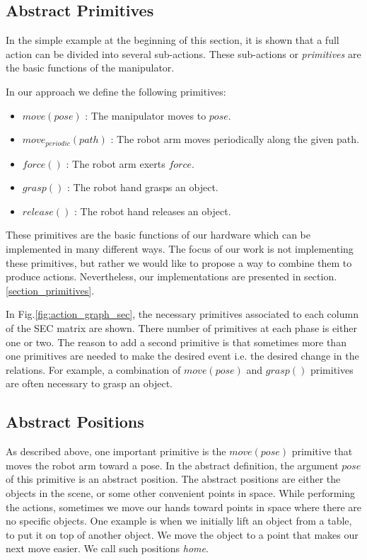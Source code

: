 \subsection{Abstract Primitives}
\label{sec:abstract_primitives}
In the simple example at the beginning of this section, it is shown that a full action can be divided into several sub-actions.
These sub-actions or \textit{primitives} are the basic functions of the manipulator.

In our approach we define the following primitives:
\begin{itemize}
 \item $move(pose)$ :  The manipulator moves to $pose$.
 \item $move_{periodic}(path)$ : The robot arm moves periodically along the given path.
 \item $force()$ : The robot arm exerts $force$.
 \item $grasp()$ : The robot hand grasps an object.
 \item $release()$ : The robot hand releases an object.
\end{itemize}


These primitives are the basic functions of our hardware which can be implemented in many different ways.
The focus of our work is not implementing these primitives,
but rather we would like to propose a way to combine them to produce actions.
Nevertheless, our implementations are presented in section.\ref{section_primitives}.

In Fig.\ref{fig:action_graph_sec}, the necessary primitives associated to each column of the SEC matrix are shown.
There number of primitives at each phase is either one or two.
The reason to add a second primitive is that sometimes more than one primitives are needed to make the desired event i.e. the desired change in the relations.
For example, a combination of $move(pose)$ and $grasp()$ primitives are often necessary to grasp an object.

\subsection{Abstract Positions}

As described above, one important primitive is the $move(pose)$ primitive that moves the robot arm toward a pose.
In the abstract definition, the argument $pose$ of this primitive is an abstract position.
The abstract positions are either the objects in the scene, or some other convenient points in space.
While performing the actions, sometimes we move our hands toward points in space where there are no specific objects.
One example is when we initially lift an object from a table, to put it on top of another object.
We move the object to a point that makes our next move easier.
We call such positions \textit{home}.

